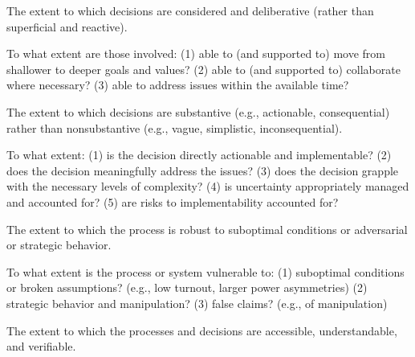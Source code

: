     \begin{describe}[black]
        The extent to which decisions are considered and deliberative (rather than superficial and reactive).
    \end{describe}
    \dscplaceholder
    
    \begin{evaluate}[black]
        To what extent are those involved: (1) able to (and supported to) move from shallower to deeper goals and values? (2) able to (and supported to) collaborate where necessary? (3) able to address issues within the available time?
    \end{evaluate}
    
    
    \begin{describe}[black]
        The extent to which decisions are substantive (e.g., actionable, consequential) rather than nonsubstantive (e.g., vague, simplistic, inconsequential).
    \end{describe}
    \dscplaceholder
    
    \begin{evaluate}[black]
        To what extent: (1) is the decision directly actionable and implementable? (2) does the decision meaningfully address the issues? (3) does the decision grapple with the necessary levels of complexity? (4) is uncertainty appropriately managed and accounted for? (5) are risks to implementability accounted for?
    \end{evaluate}
    
    
    \begin{describe}[black]
        The extent to which the process is robust to suboptimal conditions or adversarial or strategic behavior.
    \end{describe}
    \dscplaceholder
    
    \begin{evaluate}[black]
        To what extent is the process or system vulnerable to: (1) suboptimal conditions or broken assumptions? (e.g., low turnout, larger power asymmetries) (2) strategic behavior and manipulation? (3) false claims? (e.g., of manipulation)
    \end{evaluate}
    \dscplaceholder
    
    
    \begin{describe}[black]
        The extent to which the processes and decisions are accessible, understandable, and verifiable.
    \end{describe}
    \dscplaceholder
    
